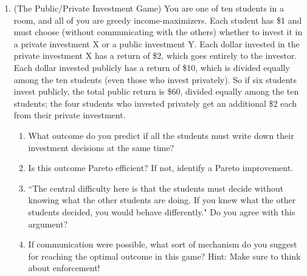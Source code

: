 \begin{enumerate}
\item (The Public/Private Investment Game) You are one of ten students in a room, and all of you are greedy income-maximizers. Each student has \$1 and must choose (without communicating with the others) whether to invest it in a private investment X or a public investment Y. Each dollar invested in the private investment X has a return of \$2, which goes entirely to the investor. Each dollar invested publicly has a return of \$10, which is divided equally among the ten students (even those who invest privately). So if six students invest publicly, the total public return is \$60, divided equally among the ten students; the four students who invested privately get an additional \$2 each from their private investment.

    \begin{enumerate}
    \item What outcome do you predict if all the students must write down their investment decisions at the same time?


    \item Is this outcome Pareto efficient? %
If not, identify a Pareto improvement.


    \item ``The central difficulty here is that the students must decide without knowing what the other students are doing. If you knew what the other students decided, you would behave differently." Do you agree with this argument? %


    \item If communication were possible, what sort of mechanism do you suggest for reaching the optimal outcome in this game? Hint: Make sure to think about enforcement!


\end{enumerate}
\end{enumerate}
